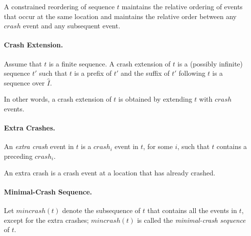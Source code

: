 \documentclass[11pt]{article}
\numberwithin{theorem}{section}
\begin{document}
A constrained reordering of sequence $t$ maintains the relative
ordering of events that occur at the same location and maintains the
relative order between any $crash$ event and any subsequent event.

\paragraph{Crash Extension.} Assume that $t$ is a finite sequence. A
crash extension of $t$ is a (possibly infinite) sequence $t'$ such
that $t$ is a prefix of $t'$ and the suffix of $t'$ following $t$ is a
sequence over $\hat{I}$.

In other words, a crash extension of $t$ is obtained by extending $t$
with $crash$ events.

\paragraph{Extra Crashes.} 
An \emph{extra crash} event in $t$ is a $crash_i$ event in $t$, for
some $i$, such that $t$ contains a preceding $crash_i$. 

An extra crash is a crash event at a location that has already
crashed.

\paragraph{Minimal-Crash Sequence.} 
Let $mincrash(t)$ denote the subsequence of $t$ that contains all the
events in $t$, except for the extra crashes; $mincrash(t)$ is called
the \emph{minimal-crash sequence} of $t$.
\end{document}
